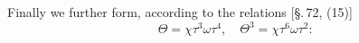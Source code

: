 Finally we further form, according to the relations [\S.\,72, (15)]
\[
\Theta = \chi \tau^3 \omega \tau^4, \quad \Theta^3 = \chi \tau^6 \omega \tau^2 \text{:}
\]
